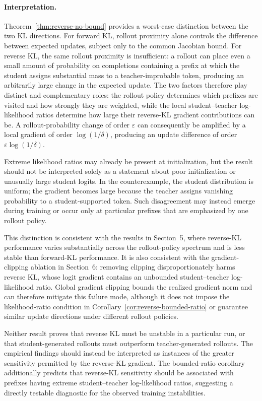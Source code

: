 \documentclass{article} %
\theoremstyle{plain}
\theoremstyle{definition}
\theoremstyle{remark}
\begin{document}
\paragraph{Interpretation.}
Theorem~\ref{thm:reverse-no-bound} provides a worst-case distinction between
the two KL directions.  For forward KL, rollout proximity alone controls the
difference between expected updates, subject only to the common Jacobian bound.
For reverse KL, the same rollout proximity is insufficient: a rollout can place
even a small amount of probability on completions containing a prefix at which
the student assigns substantial mass to a teacher-improbable token, producing
an arbitrarily large change in the expected update.  The two factors therefore
play distinct and complementary roles: the rollout policy determines which
prefixes are visited and how strongly they are weighted, while the local
student--teacher log-likelihood ratios determine how large their reverse-KL
gradient contributions can be.  A rollout-probability change of order
$\varepsilon$ can consequently be amplified by a local gradient of order
$\log(1/\delta)$, producing an update difference of order
$\varepsilon\log(1/\delta)$.

Extreme likelihood ratios may already be present at initialization, but the
result should not be interpreted solely as a statement about poor
initialization or unusually large student logits.  In the counterexample, the
student distribution is uniform; the gradient becomes large because the
teacher assigns vanishing probability to a student-supported token.  Such
disagreement may instead emerge during training or occur only at particular
prefixes that are emphasized by one rollout policy.

This distinction is consistent with the results in Section~5, where reverse-KL
performance varies substantially across the rollout-policy spectrum and is
less stable than forward-KL performance.  It is also consistent with the
gradient-clipping ablation in Section~6: removing clipping disproportionately
harms reverse KL, whose logit gradient contains an unbounded
student--teacher log-likelihood ratio.  Global gradient clipping bounds the
realized gradient norm and can therefore mitigate this failure mode, although
it does not impose the likelihood-ratio condition in
Corollary~\ref{cor:reverse-bounded-ratio} or guarantee similar update
directions under different rollout policies.

Neither result proves that reverse KL must be unstable in a particular run, or
that student-generated rollouts must outperform teacher-generated rollouts.
The empirical findings should instead be interpreted as instances of the
greater sensitivity permitted by the reverse-KL gradient.  The bounded-ratio
corollary additionally predicts that reverse-KL sensitivity should be
associated with prefixes having extreme student--teacher log-likelihood
ratios, suggesting a directly testable diagnostic for the observed training
instabilities.
\end{document}
